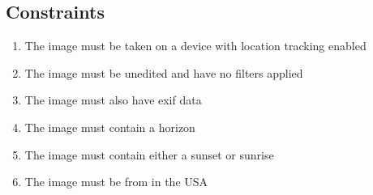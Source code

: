\documentclass[journal,10pt,draftclsnofoot,onecolumn]{IEEEtran}
\begin{document}
\begin{singlespace}
\subsection{Constraints}
\begin{enumerate}
\item The image must be taken on a device with location tracking enabled
\item The image must be unedited and have no filters applied
\item The image must also have exif data
\item The image must contain a horizon
\item The image must contain either a sunset or sunrise
\item The image must be from in the USA

\end{enumerate}
\nocite{*}




\end{singlespace}
\end{document}
